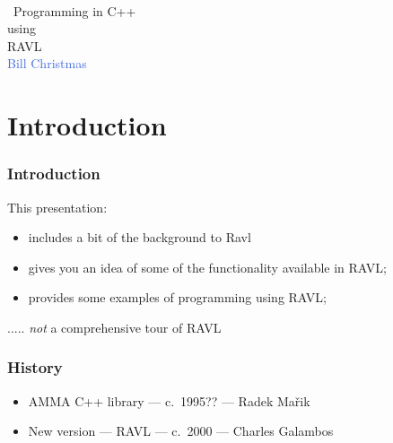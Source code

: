 \documentclass[landscape]{beamer}
\begin{document}
\begin{frame}
  \pagecolor{titlebg} %
  \begin{center}
    \huge\parbox{0.75\textwidth}{ \textcolor{titlecolor}{ \centering ~\\~Programming in C++~\\ using\\[1ex] {\Huge RAVL}\\[1em]\textcolor{royalblue}{Bill Christmas}\\[1ex]}}
  \end{center}
\end{frame}

\section{Introduction}

\begin{frame}\frametitle{Introduction}

This presentation:

\begin{itemize}
\item includes a bit of the background to Ravl

\pause\item gives you an idea of some of the functionality available in RAVL;
  
\pause\item provides some examples of programming using RAVL;

\end{itemize}

\vfill\pause  ..... {\em not} a comprehensive tour of RAVL

\end{frame}

\begin{frame}  \frametitle{History}

  \begin{itemize}
  \item AMMA C++ library --- c.\ 1995?? --- Radek Ma\v{r}ik
\vfill\pause
  \item New version --- RAVL --- c.\ 2000 --- Charles Galambos
  \end{itemize}
  
\end{frame}
\end{document}
